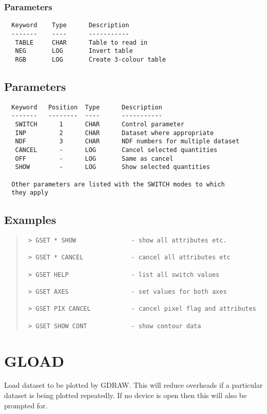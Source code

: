\documentclass{book}
\renewcommand{\_}{{\tt\char'137}}     %
\begin{document}
\subsubsection{Parameters}
\begin{verbatim}
  Keyword    Type      Description
  -------    ----      -----------
   TABLE     CHAR      Table to read in
   NEG       LOG       Invert table
   RGB       LOG       Create 3-colour table

\end{verbatim}\subsection{Parameters}
\begin{verbatim}
  Keyword   Position  Type      Description
  -------   --------  ----      -----------
   SWITCH      1      CHAR      Control parameter
   INP         2      CHAR      Dataset where appropriate
   NDF         3      CHAR      NDF numbers for multiple dataset
   CANCEL      -      LOG       Cancel selected quantities
   OFF         -      LOG       Same as cancel
   SHOW        -      LOG       Show selected quantities

  Other parameters are listed with the SWITCH modes to which
  they apply
\end{verbatim}\subsection{Examples}
\begin{quote}\begin{verbatim}
 > GSET * SHOW               - show all attributes etc.

 > GSET * CANCEL             - cancel all attributes etc

 > GSET HELP                 - list all switch values

 > GSET AXES                 - set values for both axes

 > GSET PIX CANCEL           - cancel pixel flag and attributes

 > GSET SHOW CONT            - show contour data
\end{verbatim}\end{quote}
\section{GLOAD}
Load dataset to be plotted by GDRAW. This will reduce overheads
if a particular dataset is being plotted repeatedly. If no device
is open then this will also be prompted for.
\end{document}
